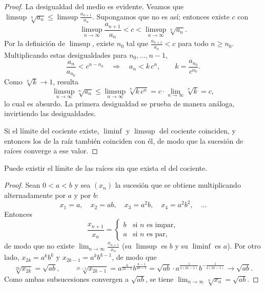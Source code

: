\begin{proof}
  La desigualdad del medio es evidente. Veamos que \(\limsup \sqrt[n]{a_n} \leq \limsup \frac{a_{n+1}}{a_n}\). Supongamos que no es así; entonces existe \(c\) con
  \[
    \limsup_{n \to \infty} \frac{a_{n+1}}{a_n} < c < \limsup_{n \to \infty} \sqrt[n]{a_n}.
  \]
  Por la definición de \(\limsup\), existe \(n_0\) tal que \(\frac{a_{n+1}}{a_n} < c\) para todo \(n \geq n_0\). Multiplicando estas desigualdades para \(n_0, \dots, n - 1\),
  \[
    \frac{a_n}{a_{n_0}} < c^{n - n_0} \quad \Longrightarrow \quad a_n < k\, c^n, \qquad k = \frac{a_{n_0}}{c^{n_0}}.
  \]
  Como \(\sqrt[n]{k} \to 1\), resulta
  \[
    \limsup_{n \to \infty} \sqrt[n]{a_n} \leq \limsup_{n \to \infty} \sqrt[n]{k\, c^n} = c \cdot \lim_{n \to \infty} \sqrt[n]{k} = c,
  \]
  lo cual es absurdo. La primera desigualdad se prueba de manera análoga, invirtiendo las desigualdades.

  Si el límite del cociente existe, \(\liminf\) y \(\limsup\) del cociente coinciden, y entonces los de la raíz también coinciden con él, de modo que la sucesión de raíces converge a ese valor.
\end{proof}

\begin{eg}
  Puede existir el límite de las raíces sin que exista el del cociente.
\end{eg}

\begin{proof}
  Sean \(0 < a < b\) y sea \({(x_n)}\) la sucesión que se obtiene multiplicando alternadamente por \(a\) y por \(b\):
  \[
    x_1 = a, \quad x_2 = a b, \quad x_3 = a^2 b, \quad x_4 = a^2 b^2, \quad \dots
  \]
  Entonces
  \[
    \frac{x_{n+1}}{x_n} =
    \begin{cases}
      b & \text{si } n \text{ es impar}, \\
      a & \text{si } n \text{ es par},
    \end{cases}
  \]
  de modo que no existe \(\lim_{n \to \infty} \frac{x_{n+1}}{x_n}\) (su \(\limsup\) es \(b\) y su \(\liminf\) es \(a\)). Por otro lado, \(x_{2k} = a^k b^k\) y \(x_{2k-1} = a^k b^{k-1}\), de modo que
  \[
    \sqrt[2k]{x_{2k}} = \sqrt{ab}, \qquad \sqrt[2k-1]{x_{2k-1}} = a^{\frac{k}{2k-1}} b^{\frac{k-1}{2k-1}} = \sqrt{ab} \cdot a^{\frac{1}{2(2k-1)}} b^{-\frac{1}{2(2k-1)}} \longrightarrow \sqrt{ab}.
  \]
  Como ambas subsucesiones convergen a \(\sqrt{ab}\), se tiene \(\lim_{n \to \infty} \sqrt[n]{x_n} = \sqrt{ab}\).
\end{proof}

